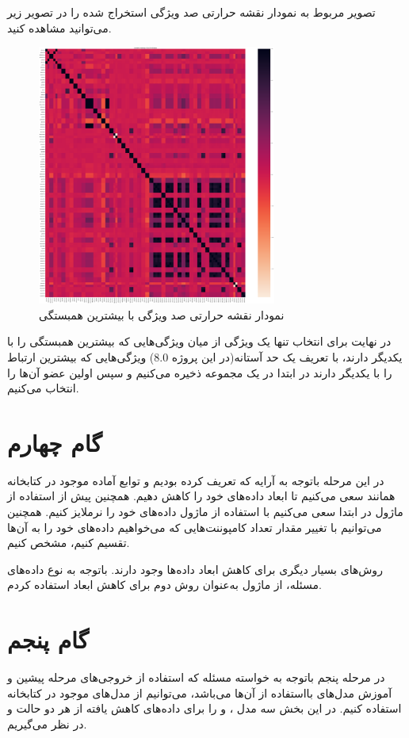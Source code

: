 \documentclass{article}
\begin{document}
تصویر مربوط به نمودار نقشه حرارتی صد ویژگی استخراج شده را در تصویر زیر می‌توانید مشاهده کنید.

\begin{figure}[ht]
        \centering
        \includegraphics[width=0.7\textwidth]{heatmap.png}
        \caption{نمودار نقشه حرارتی صد ویژگی با بیشترین همبستگی}
        \label{fig:fig2}
\end{figure}

در نهایت برای انتخاب تنها یک ویژگی از میان ویژگی‌هایی که بیشترین همبستگی را با یکدیگر دارند، با تعریف یک حد آستانه(در این پروژه 8.0) ویژگی‌هایی که بیشترین ارتباط را با یکدیگر دارند در ابتدا در یک مجموعه ذخیره می‌کنیم و سپس اولین عضو آن‌ها را انتخاب می‌کنیم.
\newpage
\section{گام چهارم}
در این مرحله باتوجه به آرایه  که تعریف کرده بودیم و توابع آماده موجود در کتابخانه  همانند  سعی می‌کنیم تا ابعاد داده‌های خود را کاهش دهیم. همچنین پیش از استفاده از ماژول  در ابتدا سعی می‌کنیم با استفاده از ماژول  داده‌های خود را نرملایز کنیم.
همچنین می‌توانیم با تغییر مقدار  تعداد کامپوننت‌هایی که می‌خواهیم داده‌های خود را به آن‌ها تقسیم کنیم، مشخص کنیم.

روش‌های بسیار دیگری برای کاهش ابعاد داده‌ها وجود دارند. باتوجه به نوع داده‌های مسئله، از ماژول  به‌عنوان روش دوم برای کاهش ابعاد استفاده کردم.

\newpage
\section{گام پنجم}
در مرحله پنجم باتوجه به خواسته مسئله که استفاده از خروجی‌های مرحله پیشین و آموزش مدل‌های  بااستفاده از آن‌ها می‌باشد، می‌توانیم از مدل‌های  موجود در کتابخانه  استفاده کنیم.
در این بخش سه مدل ،  و  را برای داده‌های کاهش یافته از هر دو حالت  و  در نظر می‌گیریم.
\end{document}
